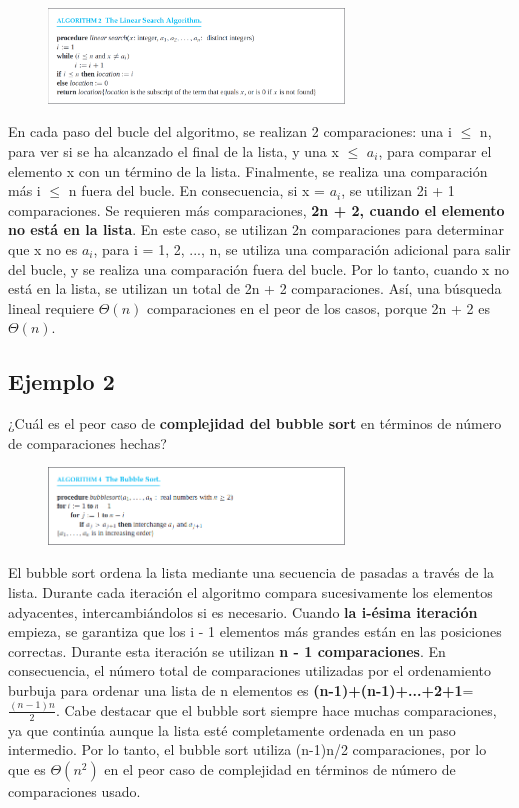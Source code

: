 \documentclass{article}
\begin{document}
\begin{figure}[h]
    \centering
    \includegraphics[width=0.7\textwidth]{img-t1/img_408_18.png}
\end{figure}

En cada paso del bucle del algoritmo, se realizan 2 comparaciones: una i $\leq$ n, para ver si se ha alcanzado el final de la lista, y una x $\leq$ $a_i$, para comparar el elemento x con un término de la lista. Finalmente, se realiza una comparación más i $\leq$ n fuera del bucle. En consecuencia, si x = $a_i$, se utilizan 2i + 1 comparaciones. Se requieren más comparaciones, \textbf{2n + 2, cuando el elemento no está en la lista}. En este caso, se utilizan 2n comparaciones para determinar que x no es $a_i$, para i = 1, 2, ..., n, se utiliza una comparación adicional para salir del bucle, y se realiza una comparación fuera del bucle. Por lo tanto, cuando x no está en la lista, se utilizan un total de 2n + 2 comparaciones. Así, una búsqueda lineal requiere $\Theta(n)$ comparaciones en el peor de los casos, porque 2n + 2 es $\Theta(n)$.

\newpage

\subsection{Ejemplo 2}
¿Cuál es el peor caso de \textbf{complejidad del bubble sort} en términos de número de comparaciones hechas?

\begin{figure}[h]
    \centering
    \includegraphics[width=0.7\textwidth]{img-t1/img_603_44.png}
\end{figure}

El bubble sort ordena la lista mediante una secuencia de pasadas a través de la lista. Durante cada iteración el algoritmo compara sucesivamente los elementos adyacentes, intercambiándolos si es necesario. Cuando \textbf{la i-ésima iteración} empieza, se garantiza que los i - 1 elementos más grandes están en las posiciones correctas. Durante esta iteración se utilizan \textbf{n - 1 comparaciones}. En consecuencia, el número total de comparaciones utilizadas por el ordenamiento burbuja para ordenar una lista de n elementos es \textbf{(n-1)+(n-1)+...+2+1}=$\frac{(n-1)n}{2}$.
Cabe destacar que el bubble sort siempre hace muchas comparaciones, ya que continúa aunque la lista esté completamente ordenada en un paso intermedio. Por lo tanto, el bubble sort utiliza (n-1)n/2 comparaciones, por lo que es $\Theta(n^2)$ en el peor caso de complejidad en términos de número de comparaciones usado.
\end{document}
